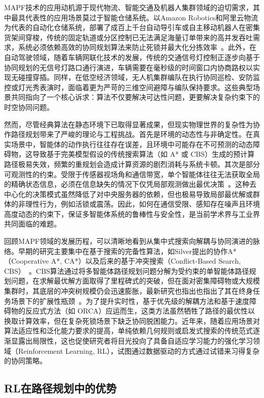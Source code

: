 \documentclass[13.5pt]{extarticle}
\begin{document}
MAPF技术的应用动机源于现代物流、智能交通及机器人集群领域的迫切需求，其中最具代表性的应用场景莫过于智能仓储系统。以Amazon Robotics和阿里云物流为代表的自动化仓储系统，部署了成百上千台自动导引车或自主移动机器人在密集货架间穿梭，传统的固定轨道或分区控制已无法满足海量订单带来的高并发吞吐需求，系统必须依赖高效的协同规划算法来防止死锁并最大化分拣效率~\cite{okumura2023lacam}。此外，在自动驾驶领域，随着车辆网联化技术的发展，传统的交通信号灯控制正逐步向基于协同规划的无信号灯路口通行演进，车辆需要在毫秒级的时间窗口内协商路权以实现无碰撞穿插。同样，在低空经济领域，无人机集群编队在执行协同巡检、安防监控或灯光秀表演时，面临着更为严苛的三维空间避障与编队保持要求。这些典型场景共同指向了一个核心诉求：算法不仅要解决可达性问题，更要解决复杂约束下的时空协同问题。

然而，尽管经典算法在静态环境下已取得显著成果，但现实物理世界的复杂性为协作路径规划带来了严峻的理论与工程挑战。首先是环境的动态性与非确定性。在真实场景中，智能体的动作执行往往存在误差，且环境中可能存在不可预测的动态障碍物，这导致基于完美模型假设的传统搜索算法（如 A* 或 CBS）生成的预计算路径极易失效，频繁的重规划会造成计算资源的剧烈消耗与系统卡顿。其次是部分可观测性的约束。受限于传感器视场角和通信带宽，单个智能体往往无法获取全局的精确状态信息，必须在信息缺失的情况下仅凭局部观测做出最优决策~\cite{rashid2018qmix}。这种去中心化的决策模式虽然降低了对中央服务器的依赖，但也极易导致局部最优解或群体的非理性行为，例如活锁或震荡。因此，如何在通信受限、感知存在噪声且环境高度动态的约束下，保证多智能体系统的鲁棒性与安全性，是当前学术界与工业界共同面临的难题。

回顾MAPF领域的发展历程，可以清晰地看到从集中式搜索向解耦与协同演进的脉络。早期的研究主要集中在基于搜索的完备性算法，如Silver提出的协作A*（Cooperative A*, CA*）以及后来的基于冲突搜索（Conflict-Based Search, CBS）~\cite{everett2018motion}。CBS算法通过将多智能体路径规划问题分解为受约束的单智能体路径规划问题，在求解最优解方面取得了里程碑式的突破，但在面对密集障碍物或大规模集群时，其底层的冲突树规模仍会迅速膨胀，最新研究也指出也指出了其在终身任务场景下的扩展性瓶颈~\cite{chan2024anytime}。为了提升实时性，基于优先级的解耦方法和基于速度障碍物的反应式方法（如 ORCA）应运而生，这类方法虽然牺牲了路径的最优性以换取计算效率，但在复杂死锁场景下缺乏协同脱困能力。近年来，随着应用场景对算法适应性和泛化能力要求的提高，单纯依赖几何规则或启发式搜索的传统范式逐渐显露出局限性，这也促使研究者将目光投向了具备自适应学习能力的强化学习领域（Reinforcement Learning, RL），试图通过数据驱动的方式通过试错来习得复杂的协同策略。
\subsection{RL在路径规划中的优势}
\end{document}
